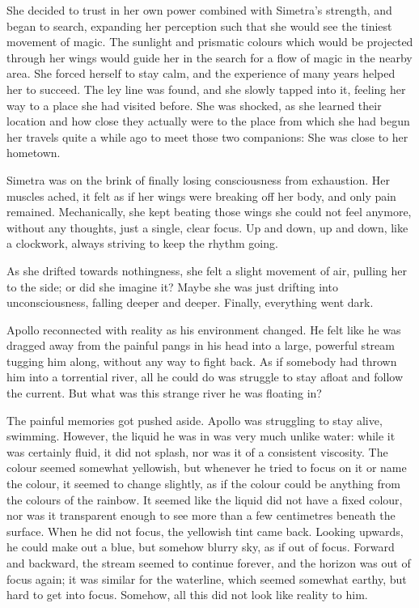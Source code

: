 She decided to trust in her own power combined with Simetra's strength, and began to search, expanding her perception such that she would see the tiniest movement of magic. The sunlight and prismatic colours which would be projected through her wings would guide her in the search for a flow of magic in the nearby area. She forced herself to stay calm, and the experience of many years helped her to succeed. The ley line was found, and she slowly tapped into it, feeling her way to a place she had visited before. She was shocked, as she learned their location and how close they actually were to the place from which she had begun her travels quite a while ago to meet those two companions: She was close to her hometown.

\fancybreaker{}

Simetra was on the brink of finally losing consciousness from exhaustion. Her muscles ached, it felt as if her wings were breaking off her body, and only pain remained. Mechanically, she kept beating those wings she could not feel anymore, without any thoughts, just a single, clear focus. Up and down, up and down, like a clockwork, always striving to keep the rhythm going. 

As she drifted towards nothingness, she felt a slight movement of air, pulling her to the side; or did she imagine it? Maybe she was just drifting into unconsciousness, falling deeper and deeper. Finally, everything went dark.

\fancybreaker{}

Apollo reconnected with reality as his environment changed. He felt like he was dragged away from the painful pangs in his head into a large, powerful stream tugging him along, without any way to fight back. As if somebody had thrown him into a torrential river, all he could do was struggle to stay afloat and follow the current. But what was this strange river he was floating in?

The painful memories got pushed aside. Apollo was struggling to stay alive, swimming. However, the liquid he was in was very much unlike water: while it was certainly fluid, it did not splash, nor was it of a consistent viscosity. The colour seemed somewhat yellowish, but whenever he tried to focus on it or name the colour, it seemed to change slightly, as if the colour could be anything from the colours of the rainbow. It seemed like the liquid did not have a fixed colour, nor was it transparent enough to see more than a few centimetres beneath the surface. When he did not focus, the yellowish tint came back. Looking upwards, he could make out a blue, but somehow blurry sky, as if out of focus. Forward and backward, the stream seemed to continue forever, and the horizon was out of focus again; it was similar for the waterline, which seemed somewhat earthy, but hard to get into focus. Somehow, all this did not look like reality to him. 

